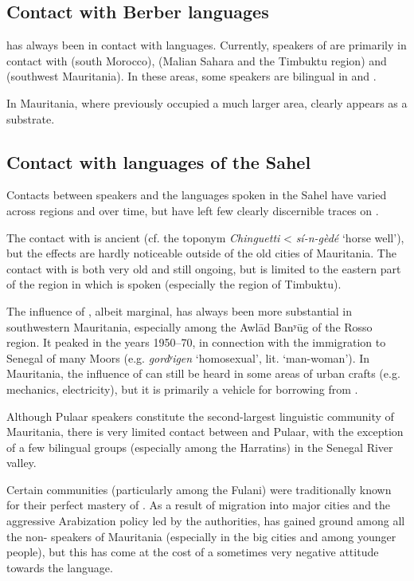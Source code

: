 \documentclass[output=paper]{langsci/langscibook}
\begin{document}
\subsection{Contact with Berber languages} %

 has always been in contact with  languages. Currently, speakers of  are primarily in contact with  (south Morocco),  (Malian Sahara and the Timbuktu region) and  (southwest Mauritania). In these areas, some speakers are bilingual in  and . 

In Mauritania, where  previously occupied a much larger area,  clearly appears as a {substrate}.

\subsection{Contact with languages of the Sahel} %

Contacts between  speakers and the languages spoken in the Sahel have varied across regions and over time, but have left few clearly discernible traces on .

The contact with  is ancient (cf. the toponym \textit{Chinguetti} <  \textit{sí-n-gèdé} ‘horse well’), but the effects are hardly noticeable outside of the old cities of Mauritania. The contact with  is both very old and still ongoing, but is limited to the eastern part of the region in which  is spoken (especially the region of Timbuktu).

The influence of , albeit marginal, has always been more substantial in southwestern Mauritania, especially among the Awlād Banʸūg of the Rosso region. It peaked in the years 1950–70, in connection with the immigration to Senegal of many Moors (e.g. \textit{gordʸigen} ‘homosexual’, lit. ‘man-woman’). In Mauritania, the influence of  can still be heard in some areas of urban crafts (e.g. mechanics, electricity), but it is primarily a vehicle for borrowing from .

Although Pulaar speakers constitute the second-largest linguistic community of Mauritania, there is very limited contact between  and Pulaar, with the exception of a few bilingual groups (especially among the Harratins) in the Senegal River valley.

Certain communities (particularly among the Fulani) were traditionally known for their perfect mastery of . As a result of migration into major cities and the aggressive {Arabization} policy led by the authorities,  has gained ground among all the non- speakers of Mauritania (especially in the big cities and among younger people), but this has come at the cost of a sometimes very negative attitude towards the language. 
\end{document}

